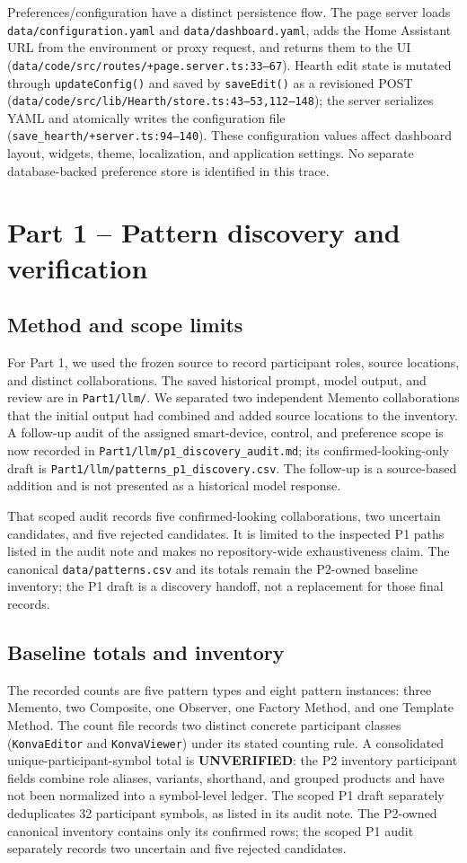 \documentclass[11pt,a4paper]{article}
\newcommand{\code}[1]{\texttt{\small #1}}
\begin{document}
Preferences/configuration have a distinct persistence flow. The page server
loads \code{data/configuration.yaml} and \code{data/dashboard.yaml}, adds the
Home Assistant URL from the environment or proxy request, and returns them to
the UI (\code{data/code/src/routes/+page.server.ts:33--67}). Hearth edit state
is mutated through \code{updateConfig()} and saved by \code{saveEdit()} as a
revisioned POST (\code{data/code/src/lib/Hearth/store.ts:43--53,112--148});
the server serializes YAML and atomically writes the configuration file
(\code{save\_hearth/+server.ts:94--140}). These
configuration values affect dashboard layout, widgets, theme, localization,
and application settings. No separate database-backed preference store is
identified in this trace.

\section{Part 1 -- Pattern discovery and verification}
\subsection{Method and scope limits}
For Part 1, we used the frozen source to record participant roles, source
locations, and distinct collaborations. The saved historical prompt, model
output, and review are in \code{Part1/llm/}. We separated two independent
Memento collaborations that the initial output had combined and added source
locations to the inventory. A follow-up audit of the assigned smart-device,
control, and preference scope is now recorded in
\code{Part1/llm/p1\_discovery\_audit.md}; its confirmed-looking-only draft is
\code{Part1/llm/patterns\_p1\_discovery.csv}. The follow-up is a source-based
addition and is not presented as a historical model response.

That scoped audit records five confirmed-looking collaborations, two
uncertain candidates, and five rejected candidates. It is limited to the
inspected P1 paths listed in the audit note and makes no repository-wide
exhaustiveness claim. The canonical \code{data/patterns.csv} and its totals
remain the P2-owned baseline inventory; the P1 draft is a discovery handoff,
not a replacement for those final records.

\subsection{Baseline totals and inventory}
The recorded counts are five pattern types and eight pattern instances:
three Memento, two Composite, one Observer, one Factory Method, and one
Template Method. The count file records two distinct concrete participant
classes (\code{KonvaEditor} and \code{KonvaViewer}) under its stated counting
rule. A consolidated unique-participant-symbol total is \textbf{UNVERIFIED}:
the P2 inventory participant fields combine role aliases, variants, shorthand,
and grouped products and have not been normalized into a symbol-level ledger.
The scoped P1 draft separately deduplicates 32 participant symbols, as listed
in its audit note. The P2-owned canonical inventory contains only its confirmed
rows; the scoped P1 audit separately records two uncertain and five rejected
candidates.
\end{document}

